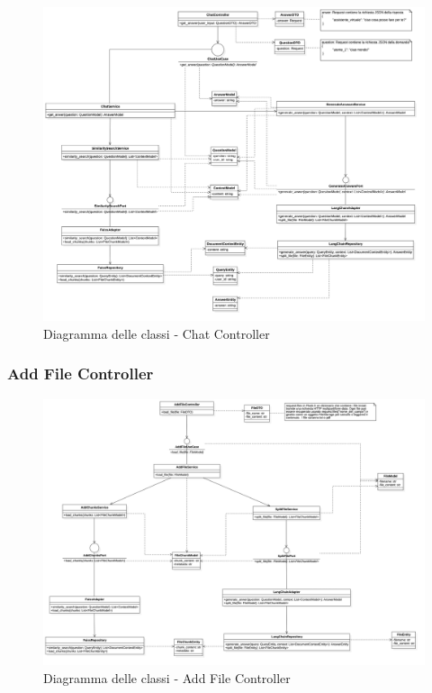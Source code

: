 \begin{figure}[H]
    \centering
    \includegraphics[width=\linewidth, height=0.8\textheight, keepaspectratio]{./img/ChatController.png}
    \caption{Diagramma delle classi - Chat Controller}
    \label{fig:chat_controller}
\end{figure}



\subsubsection{Add File Controller}
\begin{figure}[H]
    \centering
    \includegraphics[width=\linewidth, height=0.8\textheight, keepaspectratio]{./img/AddFileController.png}
    \caption{Diagramma delle classi - Add File Controller}
    \label{fig:add_file_controller}
\end{figure}



